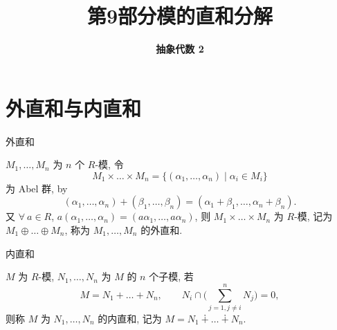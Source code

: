 \everymath{\displaystyle}



\title[模的直和分解]{\texorpdfstring{\LARGE \bfseries 第9部分\quad 模的直和分解}{第9部分 模的直和分解}}
\author[抽象代数 2]{\Large \bfseries 抽象代数 2}
\date{}





\begin{frame}

\titlepage %

\end{frame}


\section[直和]{外直和与内直和}


\begin{frame}{外直和}

\begin{Def}[外直和]
$M_1, \dots, M_n$ 为 $n$ 个 $R$-模, 令
\[
M_1 \times \dots \times M_n = \{ (\alpha_1, \dots, \alpha_n) \mid \alpha_i \in M_i \}
\]
为 Abel 群, by
\[
(\alpha_1, \dots, \alpha_n) + (\beta_1, \dots, \beta_n) = (\alpha_1 + \beta_1, \dots, \alpha_n + \beta_n).
\]
又 $\forall\ a \in R$, $a(\alpha_1, \dots, \alpha_n) = (a \alpha_1, \dots, a \alpha_n)$,
则 $M_1 \times \dots \times M_n$ 为 $R$-模, 记为 $M_1 \oplus \dots \oplus M_n$,
称为 $M_1, \dots, M_n$ 的外直和.
\end{Def}

\end{frame}


\begin{frame}{内直和}

\begin{Def}[内直和]
$M$ 为 $R$-模, $N_1, \dots, N_n$ 为 $M$ 的 $n$ 个子模, 若
\[
M = N_1 + \dots + N_n, \qquad
N_i \cap \Big( \sum_{j = 1, j \neq i}^{n} N_j \Big) = 0,
\]
则称 $M$ 为 $N_1, \dots, N_n$ 的内直和, 记为
$M = N_1 \dotplus \dots \dotplus N_n$.
\end{Def}

\end{frame}

